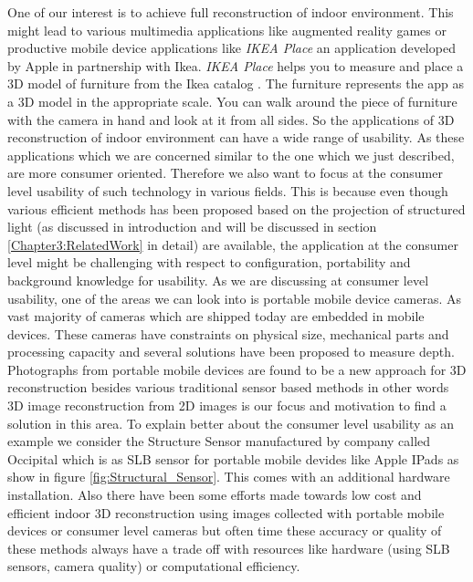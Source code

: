 One of our interest is to achieve full reconstruction of indoor environment. This might lead to various multimedia applications like augmented reality games or productive mobile device applications like \textit{IKEA Place} an application developed by Apple in partnership with Ikea. \textit{IKEA Place} helps you to measure and place a 3D model of furniture from the Ikea catalog \cite{lehnert2017neue}. The furniture represents the app as a 3D model in the appropriate scale. You can walk around the piece of furniture with the camera in hand and look at it from all sides. So the applications of 3D reconstruction of indoor environment can have a wide range of usability. As these applications which we are concerned similar to the one which we just described, are more consumer oriented. Therefore we also want to focus at the consumer level usability of such technology in various fields. This is because even though various efficient methods has been proposed based on the projection of structured light (as discussed in introduction and will be discussed in section \ref{Chapter3:RelatedWork} in detail) are available, the application at the consumer level might be challenging with respect to configuration, portability and background knowledge for usability. As we are discussing at consumer level usability, one of the areas we can look into is portable mobile device cameras. As vast majority of cameras which are shipped today are embedded in mobile devices. These cameras have constraints on physical size, mechanical parts and processing capacity and several solutions have been proposed to measure depth. Photographs from portable mobile devices are found to be a new approach for 3D reconstruction besides various traditional sensor based methods \cite{micheletti2015investigating, adan20113d} in other words 3D image reconstruction from 2D images is our focus and motivation to find a solution in this area. To explain better about the consumer level usability as an example we consider the Structure Sensor manufactured by company called Occipital which is as SLB sensor for portable mobile devides like Apple IPads as show in figure \ref{fig:Structural_Sensor}. This comes with an additional hardware installation. Also there have been some efforts made towards low cost and efficient indoor 3D reconstruction using images collected with portable mobile devices or consumer level cameras \cite{ding2019low} but often time these accuracy or quality of these methods always have a trade off with resources like hardware (using SLB sensors, camera quality) or computational efficiency.

